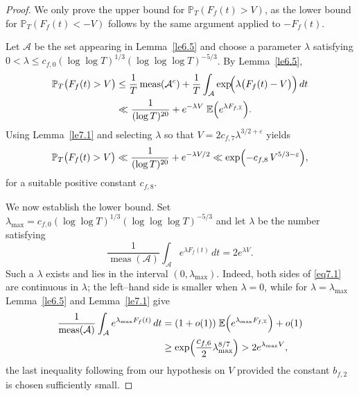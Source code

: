 \documentclass[10pt,leqno]{amsart}
\numberwithin{equation}{section}
\begin{document}
\begin{proof}
    We only prove the upper bound for $\mathbb{P}_T(F_f(t)>V)$, as the lower bound for $\mathbb{P}_T(F_f(t)<-V)$ follows by the same argument applied to $-F_f(t)$.  
    
    Let $\mathcal{A}$ be the set appearing in Lemma~\ref{le6.5} and choose a parameter $\lambda$ satisfying  
    $0<\lambda\leq c_{f,0}(\log\log T)^{1/3}(\log\log\log  T)^{-5/3}$.  
    By Lemma~\ref{le6.5},
    \[
    \begin{aligned}
    \mathbb{P}_{T}\bigl(F_f(t)>V\bigr)
    &\leq\frac{1}{T}\,\mathrm{meas}(\mathcal{A}^{c})
    +\frac{1}{T}\int_{\mathcal{A}}\exp\!\Bigl(\lambda\bigl(F_f(t)-V\bigr)\Bigr)\,dt \\
    &\ll\frac{1}{(\log T)^{20}}+e^{-\lambda V}\;
    \mathbb{E}\Bigl(e^{\lambda F_{f,\mathbb{X}}}\Bigr).
    \end{aligned}
    \]
    Using Lemma~\ref{le7.1} and selecting $\lambda$ so that $V=2c_{f,7}\lambda^{3/2+\varepsilon}$ yields
    \[
    \mathbb{P}_T\bigl(F_f(t)>V\bigr)
    \ll\frac{1}{(\log T)^{20}}+e^{-\lambda V/2}
    \ll\exp\Bigl(-c_{f,8}\,V^{5/3-\varepsilon}\Bigr),
    \]
    for a suitable positive constant $c_{f,8}$.
    
    We now establish the lower bound.  
    Set $\lambda_{\max}=c_{f,0}(\log\log T)^{1/3}(\log\log\log  T)^{-5/3}$ and let $\lambda$ be the number  satisfying
    \begin{equation}\label{eq7.1}
    \frac{1}{\operatorname{meas}(\mathcal{A})}
    \int_{\mathcal{A}}e^{\lambda F_f(t)}\,dt = 2e^{\lambda V}.
    \end{equation}
    Such a $\lambda$ exists and lies in the interval $(0,\lambda_{\max})$.  
    Indeed, both sides of \eqref{eq7.1} are continuous in $\lambda$; the left–hand side is smaller when $\lambda=0$, while for $\lambda=\lambda_{\max}$ Lemma~\ref{le6.5} and Lemma~\ref{le7.1} give
    \[
    \begin{aligned}
    \frac{1}{\operatorname{meas}(\mathcal{A})}\int_{\mathcal{A}} e^{\lambda_{\max} F_f(t)}\,dt
    &=(1+o(1))\;\mathbb{E}\Bigl(e^{\lambda_{\max} F_{f,\mathbb{X}}}\Bigr)+o(1) \\
    &\geq\exp\Bigl(\frac{c_{f,6}}{2}\lambda_{\max}^{8/7}\Bigr)
    >2e^{\lambda_{\max}V},
    \end{aligned}
    \]
    the last inequality following from our hypothesis on $V$ provided the constant $b_{f,2}$ is chosen sufficiently small.
    

\end{proof}
\end{document}
